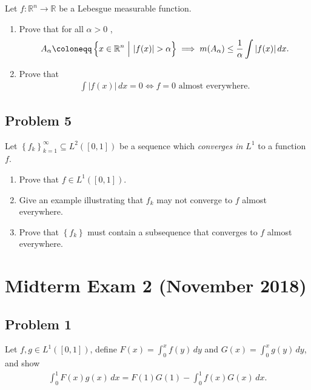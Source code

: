 Let \(f: {\mathbb{R}}^n\to {\mathbb{R}}\) be a Lebesgue measurable
function.

\begin{enumerate}
\def\labelenumi{\alph{enumi}.}
\item
  Prove that for all \(\alpha> 0\) ,
  \begin{align*}
  A_ \alpha  \coloneqq\left\{{x\in {\mathbb{R}}^n {~\mathrel{\Big|}~}{\left\lvert { f(x) } \right\rvert} > \alpha}\right\} \implies m(A_ \alpha) \leq {1\over \alpha} \int {\left\lvert {f (x)} \right\rvert} \,dx
  .\end{align*}
\item
  Prove that
  \begin{align*}
  \int {\left\lvert { f(x) } \right\rvert} \,dx= 0 \iff f = 0 \text{ almost everywhere}
  .\end{align*}
\end{enumerate}

\hypertarget{problem-5}{%
\subsection{Problem 5}\label{problem-5}}

Let \(\left\{{ f_k }\right\}_{k=1}^{\infty } \subseteq L^2([0, 1])\) be
a sequence which \emph{converges in \(L^1\)} to a function \(f\).

\begin{enumerate}
\def\labelenumi{\alph{enumi}.}
\item
  Prove that \(f\in L^1([0, 1])\).
\item
  Give an example illustrating that \(f_k\) may not converge to \(f\)
  almost everywhere.
\item
  Prove that \(\left\{{f_k}\right\}\) must contain a subsequence that
  converges to \(f\) almost everywhere.
\end{enumerate}

\hypertarget{midterm-exam-2-november-2018}{%
\section{Midterm Exam 2 (November
2018)}\label{midterm-exam-2-november-2018}}

\hypertarget{problem-1-1}{%
\subsection{Problem 1}\label{problem-1-1}}

Let \(f, g\in L^1([0, 1])\), define \(F(x) = \int_0^x f(y)\,dy\) and
\(G(x) = \int_0^x g(y)\,dy\), and show
\begin{align*}
\int_0^1 F(x)g(x) \,dx = F(1)G(1) - \int_0^1 f(x) G(x) \, dx
.\end{align*}

